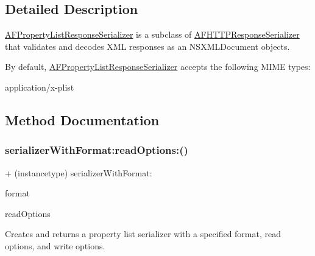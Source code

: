 \subsection{Detailed Description}
{\ttfamily \mbox{\hyperlink{interface_a_f_property_list_response_serializer}{A\+F\+Property\+List\+Response\+Serializer}}} is a subclass of {\ttfamily \mbox{\hyperlink{interface_a_f_h_t_t_p_response_serializer}{A\+F\+H\+T\+T\+P\+Response\+Serializer}}} that validates and decodes X\+ML responses as an {\ttfamily N\+S\+X\+M\+L\+Document} objects.

By default, {\ttfamily \mbox{\hyperlink{interface_a_f_property_list_response_serializer}{A\+F\+Property\+List\+Response\+Serializer}}} accepts the following M\+I\+ME types\+:


\begin{DoxyItemize}
\item {\ttfamily application/x-\/plist} 
\end{DoxyItemize}

\subsection{Method Documentation}
\mbox{\label{interface_a_f_property_list_response_serializer_a8998ba88f9bdae98d24a0e113ff6bbcf}} 
\subsubsection{\texorpdfstring{serializer\+With\+Format\+:read\+Options\+:()}{serializerWithFormat:readOptions:()}\hspace{0.1cm}{\footnotesize\ttfamily [1/3]}}
{\footnotesize\ttfamily + (instancetype) serializer\+With\+Format\+: \begin{DoxyParamCaption}\item[{(N\+S\+Property\+List\+Format)}]{format }\item[{readOptions:(N\+S\+Property\+List\+Read\+Options)}]{read\+Options }\end{DoxyParamCaption}}

Creates and returns a property list serializer with a specified format, read options, and write options.


